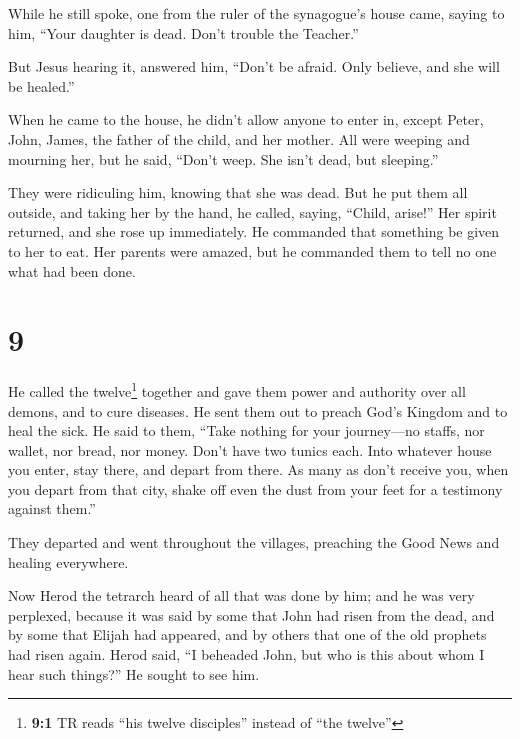  While he still spoke, one from the ruler of the
synagogue's house came, saying to him, ``Your daughter is dead. Don't
trouble the Teacher.''

 But Jesus hearing it, answered him, ``Don't be afraid.
Only believe, and she will be healed.''

 When he came to the house, he didn't allow anyone to
enter in, except Peter, John, James, the father of the child, and her
mother.  All were weeping and mourning her, but he said,
``Don't weep. She isn't dead, but sleeping.''

 They were ridiculing him, knowing that she was dead.
 But he put them all outside, and taking her by the hand,
he called, saying, ``Child, arise!''  Her spirit
returned, and she rose up immediately. He commanded that something be
given to her to eat.  Her parents were amazed, but he
commanded them to tell no one what had been done.

\hypertarget{section-8}{%
\section{9}\label{section-8}}

 He called the twelve\footnote{\textbf{9:1} TR reads ``his
  twelve disciples'' instead of ``the twelve''} together and gave them
power and authority over all demons, and to cure diseases.
 He sent them out to preach God's Kingdom and to heal the
sick.  He said to them, ``Take nothing for your
journey---no staffs, nor wallet, nor bread, nor money. Don't have two
tunics each.  Into whatever house you enter, stay there,
and depart from there.  As many as don't receive you, when
you depart from that city, shake off even the dust from your feet for a
testimony against them.''

 They departed and went throughout the villages, preaching
the Good News and healing everywhere.

 Now Herod the tetrarch heard of all that was done by him;
and he was very perplexed, because it was said by some that John had
risen from the dead,  and by some that Elijah had
appeared, and by others that one of the old prophets had risen again.
 Herod said, ``I beheaded John, but who is this about whom
I hear such things?'' He sought to see him.


